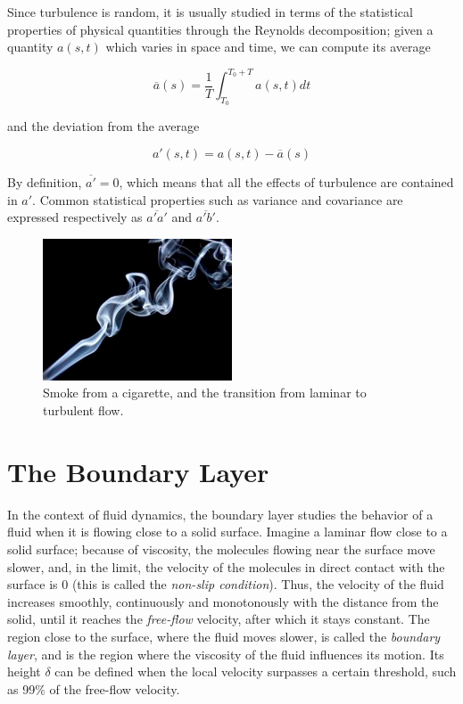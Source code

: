 \documentclass[12pt]{book}
\begin{document}
Since turbulence is random, it is usually studied in terms of the statistical properties of physical quantities through the Reynolds decomposition; given a quantity $a(s,t)$ which varies in space and time, we can compute its average

$$
\overline{a}(s)=\frac{1}{T}\int_{T_0}^{T_0+T}a(s,t)dt
$$

and the deviation from the average

$$
a'(s,t)=a(s,t)-\overline{a}(s)
$$

By definition, $\overline{a'}=0$, which means that all the effects of turbulence are contained in $a'$. Common statistical properties such as variance and covariance are expressed respectively as $\overline{a'a'}$ and $\overline{a'b'}$.

\begin{figure}
\caption{Smoke from a cigarette, and the transition from laminar to turbulent flow.}
\label{fig:smoke}
\centering
\includegraphics[width=0.5\textwidth]{images/smoke}
\end{figure}


\section{The Boundary Layer}
In the context of fluid dynamics, the boundary layer studies the behavior of a fluid when it is flowing close to a solid surface. Imagine a laminar flow close to a solid surface; because of viscosity, the molecules flowing near the surface move slower, and, in the limit, the velocity of the molecules in direct contact with the surface is 0 (this is called the \emph{non-slip condition}). Thus, the velocity of the fluid increases smoothly, continuously and monotonously with the distance from the solid, until it reaches the \emph{free-flow} velocity, after which it stays constant. The region close to the surface, where the fluid moves slower, is called the \emph{boundary layer}, and is the region where the viscosity of the fluid influences its motion. Its height $\delta$ can be defined when the local velocity surpasses a certain threshold, such as 99\% of the free-flow velocity.
\end{document}
